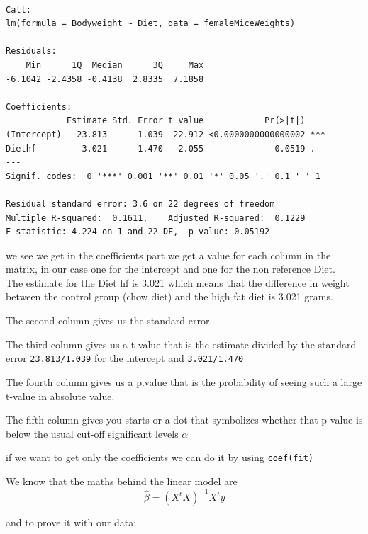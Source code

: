 \documentclass[
  letterpaper,
  DIV=11,
  numbers=noendperiod]{scrartcl}
\newenvironment{Shaded}{\begin{snugshade}}{\end{snugshade}}
\newcommand{\AttributeTok}[1]{\textcolor[rgb]{0.40,0.45,0.13}{#1}}
\newcommand{\FunctionTok}[1]{\textcolor[rgb]{0.28,0.35,0.67}{#1}}
\newcommand{\NormalTok}[1]{\textcolor[rgb]{0.00,0.23,0.31}{#1}}
\newcommand{\OtherTok}[1]{\textcolor[rgb]{0.00,0.23,0.31}{#1}}
\newcommand{\SpecialCharTok}[1]{\textcolor[rgb]{0.37,0.37,0.37}{#1}}
\begin{document}
\begin{verbatim}

Call:
lm(formula = Bodyweight ~ Diet, data = femaleMiceWeights)

Residuals:
    Min      1Q  Median      3Q     Max 
-6.1042 -2.4358 -0.4138  2.8335  7.1858 

Coefficients:
            Estimate Std. Error t value            Pr(>|t|)    
(Intercept)   23.813      1.039  22.912 <0.0000000000000002 ***
Diethf         3.021      1.470   2.055              0.0519 .  
---
Signif. codes:  0 '***' 0.001 '**' 0.01 '*' 0.05 '.' 0.1 ' ' 1

Residual standard error: 3.6 on 22 degrees of freedom
Multiple R-squared:  0.1611,    Adjusted R-squared:  0.1229 
F-statistic: 4.224 on 1 and 22 DF,  p-value: 0.05192
\end{verbatim}

we see we get in the coefficients part we get a value for each column in
the matrix, in our case one for the intercept and one for the non
reference Diet.\\
The estimate for the Diet hf is 3.021 which means that the difference in
weight between the control group (chow diet) and the high fat diet is
3.021 grams.

The second column gives us the standard error.

The third column gives us a t-value that is the estimate divided by the
standard error \texttt{23.813/1.039} for the intercept and
\texttt{3.021/1.470}

The fourth column gives us a p.value that is the probability of seeing
such a large t-value in absolute value.

The fifth column gives you starts or a dot that symbolizes whether that
p-value is below the usual cut-off significant levels \(\alpha\)

if we want to get only the coefficients we can do it by using
\texttt{coef(fit)}

We know that the maths behind the linear model are \[
\hat{\beta}= (X^t X)^{-1} X^t y
\]

and to prove it with our data:

\begin{Shaded}
\end{Shaded}
\end{document}
